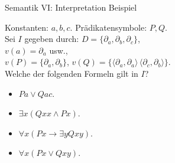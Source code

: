 \documentclass[12pt]{beamer}
\begin{document}

\begin{frame}{Semantik VI: Interpretation Beispiel}

  Konstanten: $a, b, c$. Prädikatensymbole: $P, Q$. \\
  Sei $I$ gegeben durch: $D = \{\partial_a, \partial_b, \partial_c\}$,\\
  $v(a) = \partial_a$ usw., \\
  $v(P) = \{\partial_a, \partial_b\}$, $v(Q) = \{\langle \partial_a, \partial_a \rangle\, \langle \partial_c, \partial_b \rangle \}$.\\
  Welche der folgenden Formeln gilt in $I$?

  \pause

  \begin{itemize}[<+->]
  \item $Pa \lor Qac$.
  \item $\exists x (Qxx \land Px)$.
  \item $\forall x (Px \to \exists y Qxy)$.
  \item $\forall x (Px \lor Qxy).$
  \end{itemize}

\end{frame}
\end{document}
